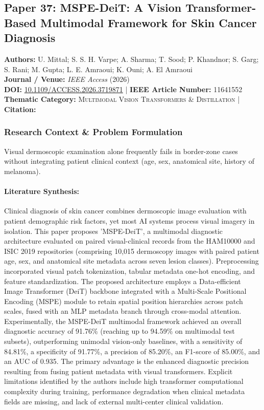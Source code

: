 \subsection{Paper 37: MSPE-DeiT: A Vision Transformer-Based Multimodal Framework for Skin Cancer Diagnosis}
\label{sec:paper_37}

\begin{tcolorbox}[colback=gray!5!white,colframe=gray!75!black,title=\textbf{Metadata \& Citation Summary}]
\textbf{Authors:} U. Mittal; S. S. H. Varpe; A. Sharma; T. Sood; P. Khandnor; S. Garg; S. Rani; M. Gupta; L. E. Amraoui; K. Ouni; A. El Amraoui \\
\textbf{Journal / Venue:} \textit{IEEE Access} (2026) \\
\textbf{DOI:} \href{https://doi.org/10.1109/ACCESS.2026.3719871}{10.1109/ACCESS.2026.3719871} \quad | \quad \textbf{IEEE Article Number:} 11641552 \\
\textbf{Thematic Category:} \textsc{Multimodal Vision Transformers \& Distillation} \quad | \quad \textbf{Citation:} \cite{11641552}
\end{tcolorbox}

\subsubsection*{Research Context \& Problem Formulation}
Visual dermoscopic examination alone frequently fails in border-zone cases without integrating patient clinical context (age, sex, anatomical site, history of melanoma).

\paragraph{Literature Synthesis:} Clinical diagnosis of skin cancer combines dermoscopic image evaluation with patient demographic risk factors, yet most AI systems process visual imagery in isolation. This paper proposes 'MSPE-DeiT', a multimodal diagnostic architecture evaluated on paired visual-clinical records from the HAM10000 and ISIC 2019 repositories (comprising 10,015 dermoscopy images with paired patient age, sex, and anatomical site metadata across seven lesion classes). Preprocessing incorporated visual patch tokenization, tabular metadata one-hot encoding, and feature standardization. The proposed architecture employs a Data-efficient Image Transformer (DeiT) backbone integrated with a Multi-Scale Positional Encoding (MSPE) module to retain spatial position hierarchies across patch scales, fused with an MLP metadata branch through cross-modal attention. Experimentally, the MSPE-DeiT multimodal framework achieved an overall diagnostic accuracy of 91.76\% (reaching up to 94.59\% on multimodal test subsets), outperforming unimodal vision-only baselines, with a sensitivity of 84.81\%, a specificity of 91.77\%, a precision of 85.20\%, an F1-score of 85.00\%, and an AUC of 0.935. The primary advantage is the enhanced diagnostic precision resulting from fusing patient metadata with visual transformers. Explicit limitations identified by the authors include high transformer computational complexity during training, performance degradation when clinical metadata fields are missing, and lack of external multi-center clinical validation.

